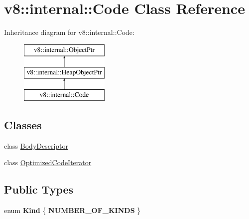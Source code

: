 \hypertarget{classv8_1_1internal_1_1Code}{}\section{v8\+:\+:internal\+:\+:Code Class Reference}
\label{classv8_1_1internal_1_1Code}
Inheritance diagram for v8\+:\+:internal\+:\+:Code\+:\begin{figure}[H]
\begin{center}
\leavevmode
\includegraphics[height=3.000000cm]{classv8_1_1internal_1_1Code}
\end{center}
\end{figure}
\subsection*{Classes}
\begin{DoxyCompactItemize}
\item 
class \mbox{\hyperlink{classv8_1_1internal_1_1Code_1_1BodyDescriptor}{Body\+Descriptor}}
\item 
class \mbox{\hyperlink{classv8_1_1internal_1_1Code_1_1OptimizedCodeIterator}{Optimized\+Code\+Iterator}}
\end{DoxyCompactItemize}
\subsection*{Public Types}
\begin{DoxyCompactItemize}
\item 
\mbox{\label{classv8_1_1internal_1_1Code_aabd99abf83167f429b6ad4f0b761466e}} 
enum {\bfseries Kind} \{ {\bfseries N\+U\+M\+B\+E\+R\+\_\+\+O\+F\+\_\+\+K\+I\+N\+DS}
 \}
\end{DoxyCompactItemize}

